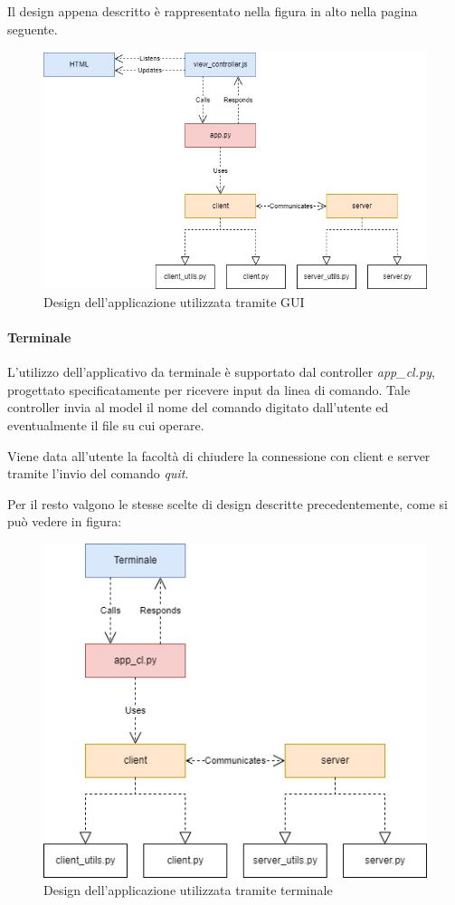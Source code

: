 \documentclass[a4paper,12pt]{report}
\begin{document}
Il design appena descritto è rappresentato nella figura in alto nella pagina seguente.
\begin{figure}[H]
    \centering
    \includegraphics[width=\textwidth]{img/app_design.jpg}
    \caption{Design dell'applicazione utilizzata tramite GUI}
\end{figure}

\paragraph{Terminale} 
L'utilizzo dell'applicativo da terminale è supportato dal controller \textit{app\_cl.py}, progettato specificatamente per ricevere input da linea di comando. Tale controller invia al model il nome del comando digitato dall'utente ed eventualmente il file su cui operare.

Viene data all'utente la facoltà di chiudere la connessione con client e server tramite l'invio del comando \textit{quit}.

Per il resto valgono le stesse scelte di design descritte precedentemente, come si può vedere in figura:
\begin{figure}[H]
    \centering
    \includegraphics[scale=0.7]{img/cl_design.jpg}
    \caption{Design dell'applicazione utilizzata tramite terminale}
\end{figure}
\end{document}

